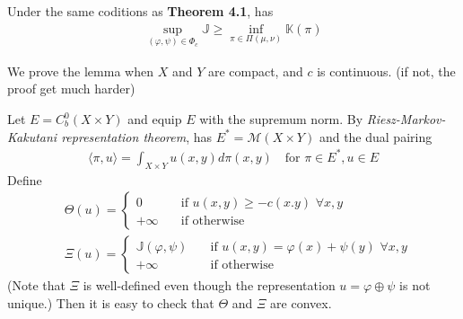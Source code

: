 \documentclass[12pt,a4paper]{article}
\newenvironment{proof}
{\begin{changemargin}{1cm}{0.5cm} 
	}%
	{\end{changemargin}
}
\newenvironment{p}
{\begin{proof} 
	}%
	{\end{proof}
}
\begin{document}
 Under the same coditions as \textbf{Theorem 4.1}, has
\begin{align*}
\sup_{(\varphi, \psi)\in \Phi_c} \mathbb{J} \geq \inf_{\pi \in \Pi(\mu, \nu)} \mathbb{K}(\pi) 
\end{align*}
\begin{p}
\pf We prove the lemma when $X$ and $Y$ are compact, and $c$ is continuous. (if not, the proof get much harder)

Let $E= C_b^0 (X\times Y)$ and equip $E$ with the supremum norm. By \emph{Riesz-Markov-Kakutani representation theorem}, has $E^* = \mathscr{M}(X\times Y)$ and the dual pairing
\begin{align*}
\langle \pi, u \rangle = \int_{X\times Y} u(x,y) d\pi(x,y) \quad \text{for } \pi \in E^*, u\in E
\end{align*}
Define
\begin{align*}
& \Theta(u) = \begin{cases}
0 \quad & \text{if } u(x,y) \geq -c(x.y) \,\, \forall x,y\\
+\infty \quad & \text{if otherwise}
\end{cases} \\
& \Xi(u) = \begin{cases}
\mathbb{J}(\varphi, \psi) \quad & \text{if } u(x,y) =\varphi(x) + \psi(y) \,\, \forall x,y\\
+\infty \quad & \text{if otherwise}
\end{cases}
\end{align*}
(Note that $\Xi$ is well-defined even though the representation $u = \varphi \oplus \psi$ is not unique.) Then it is easy to check that $\Theta$ and $\Xi$ are convex.


\end{p}
\end{document}
